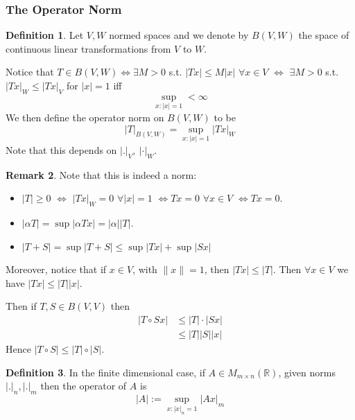 \documentclass[11pt,a4paper]{article}
\theoremstyle{definition}
\newtheorem{definition}{Definition}[section]
\newtheorem{remark}[definition]{Remark}
\theoremstyle{plain}
\theoremstyle{remark}
\newcommand{\R}{\mathbb{R}}
\newcommand{\abs}[1]{\lvert #1 \rvert}
\newcommand{\norm}[1]{\lVert #1 \rVert}
\begin{document}
\subsubsection{The Operator Norm} 
\begin{definition}
    Let $V,W$ normed spaces and we denote by $B(V,W)$ the space of continuous linear transformations  
    from $V$ to $W$. 

    Notice that $T \in B(V,W) \iff \exists M > 0$ s.t. $\abs{Tx} \le M \abs{x}$ $\forall x \in V$ $\iff$
    $\exists M > 0$ s.t. $\abs{Tx}_W \le \abs{Tx}_V$ for $\abs{x} = 1$ iff 
    $$\sup_{x \colon \abs{x} = 1} < \infty$$
    We then define the operator norm on $B(V,W)$ to be 
    $$\abs{T}_{B(V,W)} = \sup_{x \colon \abs{x} = 1} \abs{Tx}_W$$
    Note that this depends on $\abs{.}_V, \ \abs{\cdot}_W$.
\end{definition}

\begin{remark}
    Note that this is indeed a norm: 
    \begin{itemize}
        \item $\abs{T} \ge 0$ $\iff$ $\abs{Tx}_W = 0$ $\forall \abs{x} = 1$ $\iff Tx = 0$ $\forall x \in V$ 
        $\iff Tx = 0$. 

        \item $\abs{\alpha T} = \sup \abs{\alpha Tx} = \abs{\alpha} \abs{T}$. 
        
        \item $\abs{T+S} = \sup \abs{T+S} \le \sup \abs{Tx} + \sup \abs{Sx}$ 
    \end{itemize}

    Moreover, notice that if $x \in V$, with $\norm{x} = 1$, then $\abs{Tx} \le \abs{T}$. 
    Then $\forall x \in V$ we have $\abs{Tx} \le \abs{T} \abs{x}$. 

    Then if $T,S \in B(V,V)$ then 
    \begin{align*}
        \abs{T \circ S x} &\le \abs{T} \cdot \abs{Sx} \\
        &\le \abs{T} \abs{S} \abs{x} 
    \end{align*}
    Hence $\abs{T \circ S} \le \abs{T} \circ \abs{S}$.
\end{remark}

\begin{definition}
    In the finite dimensional case, if $A \in M_{m \times n} (\R)$, 
    given norms $\abs{.}_n, \abs{.}_m$ then the operator of $A$ is 
    $$\abs{A} := \sup_{x \colon \abs{x}_n = 1} \abs{Ax}_m$$
\end{definition}
\end{document}
